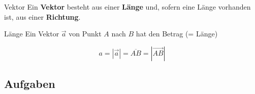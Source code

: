 

\begin{definition}{Vektor}{}
  Ein \textbf{Vektor} besteht aus einer \textbf{Länge} und, sofern eine Länge
  vorhanden ist, aus einer \textbf{Richtung}.
\end{definition}


    \begin{definition}{Länge}{}
      Ein Vektor $\vec{a}$ von Punkt $A$ nach $B$ hat den Betrag (= Länge)

      $$a = |\vec{a}| = \overline{AB} = \left|\overrightarrow{AB}\right|$$
    \end{definition}


\subsection*{Aufgaben}\
\newpage
